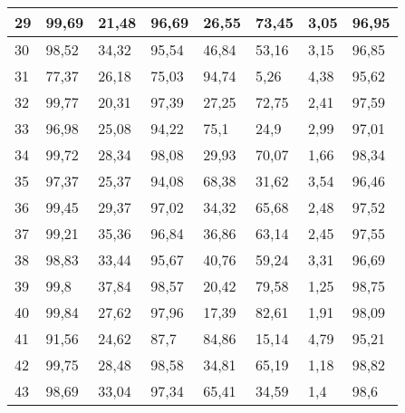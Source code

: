 \begin{longtable}[c]{|l|l|l|l|l|l|l|l|}
29              & 99,69        & 21,48        & 96,69       & 26,55         & 73,45         & 3,05          & 96,95         \\ \hline
30              & 98,52        & 34,32        & 95,54       & 46,84         & 53,16         & 3,15          & 96,85         \\ \hline
31              & 77,37        & 26,18        & 75,03       & 94,74         & 5,26          & 4,38          & 95,62         \\ \hline
32              & 99,77        & 20,31        & 97,39       & 27,25         & 72,75         & 2,41          & 97,59         \\ \hline
33              & 96,98        & 25,08        & 94,22       & 75,1          & 24,9          & 2,99          & 97,01         \\ \hline
34              & 99,72        & 28,34        & 98,08       & 29,93         & 70,07         & 1,66          & 98,34         \\ \hline
35              & 97,37        & 25,37        & 94,08       & 68,38         & 31,62         & 3,54          & 96,46         \\ \hline
36              & 99,45        & 29,37        & 97,02       & 34,32         & 65,68         & 2,48          & 97,52         \\ \hline
37              & 99,21        & 35,36        & 96,84       & 36,86         & 63,14         & 2,45          & 97,55         \\ \hline
38              & 98,83        & 33,44        & 95,67       & 40,76         & 59,24         & 3,31          & 96,69         \\ \hline
39              & 99,8         & 37,84        & 98,57       & 20,42         & 79,58         & 1,25          & 98,75         \\ \hline
40              & 99,84        & 27,62        & 97,96       & 17,39         & 82,61         & 1,91          & 98,09         \\ \hline
41              & 91,56        & 24,62        & 87,7        & 84,86         & 15,14         & 4,79          & 95,21         \\ \hline
42              & 99,75        & 28,48        & 98,58       & 34,81         & 65,19         & 1,18          & 98,82         \\ \hline
43              & 98,69        & 33,04        & 97,34       & 65,41         & 34,59         & 1,4           & 98,6          \\ \hline

\end{longtable}
